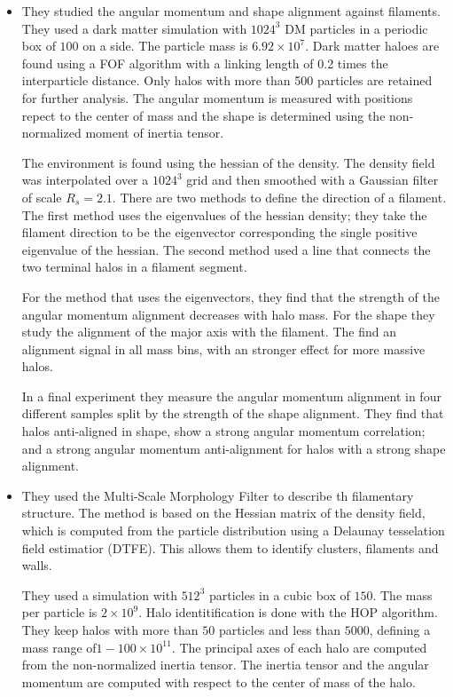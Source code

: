\documentclass[useAMS,usenatbib]{mn2e}
\newcommand{\hMpc}{{\ifmmode{h^{-1}{\rm Mpc}}\else{$h^{-1}$Mpc }\fi}}
\newcommand{\hMsun}{{\ifmmode{h^{-1}{\rm
        {M_{\odot}}}}\else{$h^{-1}{\rm{M_{\odot}}}$~}\fi}}
\begin{document}
\begin{itemize}
\item
\citep{Zhang2009}

They studied the angular momentum and shape alignment against
filaments.  They used a dark matter simulation with $1024^3$ DM particles in a
periodic box of $100$ \hMpc on a side. The particle mass is
$6.92\times10^{7}$\hMsun. Dark matter haloes are found using a FOF
algorithm with a linking length of 0.2 times the interparticle
distance. Only halos with more than 500 particles are retained for
further analysis. The angular momentum is measured with positions
repect to the center of mass and the shape is determined using the
non-normalized moment of inertia tensor.

The environment is found using the hessian of the density. The density
field was interpolated over a $1024^3$ grid and then smoothed with a
Gaussian filter of scale $R_{s} = 2.1$\hMpc. There are two methods to
define the direction of a filament. The first method uses the
eigenvalues of the hessian density; they take the filament
direction to be the eigenvector corresponding the single positive
eigenvalue of the hessian. The second method used a line that
connects the two terminal halos in a filament segment.

For the method that uses the eigenvectors, they find that the strength
of the angular momentum alignment decreases with halo mass. For the
shape they study the alignment of the major axis with the
filament. The find an alignment signal in all mass bins, with an
stronger effect for more massive halos. 

In a final experiment they measure the angular momentum alignment in four
different samples split by the strength of the shape alignment. They
find that halos anti-aligned in shape, show a strong angular momentum
correlation; and a strong angular momentum anti-alignment for halos
with a strong shape alignment.

\item
\citep{AragonCalvo2007}


They used the Multi-Scale Morphology Filter to describe th filamentary
structure. The method is based on the Hessian matrix of the density
field, which is computed from the particle distribution using a
Delaunay tesselation field estimatior (DTFE). This allows them to
identify clusters, filaments and walls.

They used a simulation with $512^3$ particles in a cubic box of $150$\hMpc. The
mass per particle is $2\times 10^{9}$\hMsun.  Halo identitification is
done with the HOP algorithm. They keep halos with more than $50$
particles and less than $5000$, defining a mass range of$1-100\times
10^{11}$\hMsun. The principal axes of each halo are computed from the
non-normalized inertia tensor. The inertia tensor and the angular
momentum are computed with respect to the center of mass of the halo. 


\end{itemize}
\end{document}
